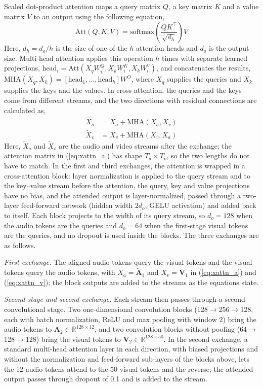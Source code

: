 \documentclass[pdflatex,iicol,sn-basic]{sn-jnl}
\begin{document}
Scaled dot-product attention \citep{vaswani2017attention} maps a query matrix $Q$, a key matrix $K$ and a value matrix $V$ to an output using the following equation,
\begin{equation}
\mathrm{Att}(Q,K,V) = \mathrm{softmax}\!\left(\frac{QK^{\top}}{\sqrt{d_h}}\right) V
\end{equation}
Here, $d_h = d_o / h$ is the size of one of the $h$ attention heads and $d_o$ is the output size. Multi-head attention applies this operation $h$ times with separate learned projections, $\mathrm{head}_i = \mathrm{Att}(X_q W_i^{Q}, X_k W_i^{K}, X_k W_i^{V})$, and concatenates the results, $\mathrm{MHA}(X_q, X_k) = [\mathrm{head}_1, \ldots, \mathrm{head}_h] W^{O}$, where $X_q$ supplies the queries and $X_k$ supplies the keys and the values. In cross-attention, the queries and the keys come from different streams, and the two directions with residual connections are calculated as,
\begin{align}
\tilde{X}_a &= X_a + \mathrm{MHA}(X_a, X_v) \label{eq:xattn_a}\\
\tilde{X}_v &= X_v + \mathrm{MHA}(X_v, X_a) \label{eq:xattn_v}
\end{align}
Here, $\tilde{X}_a$ and $\tilde{X}_v$ are the audio and video streams after the exchange; the attention matrix in (\ref{eq:xattn_a}) has shape $T_a \times T_v$, so the two lengths do not have to match. In the first and third exchanges, the attention is wrapped in a cross-attention block: layer normalization is applied to the query stream and to the key--value stream before the attention, the query, key and value projections have no bias, and the attended output is layer-normalized, passed through a two-layer feed-forward network (hidden width $2d_o$, GELU activation) and added back to itself. Each block projects to the width of its query stream, so $d_o = 128$ when the audio tokens are the queries and $d_o = 64$ when the first-stage visual tokens are the queries, and no dropout is used inside the blocks. The three exchanges are as follows.

\emph{First exchange.} The aligned audio tokens query the visual tokens and the visual tokens query the audio tokens, with $X_a = \tilde{\mathbf{A}}_1$ and $X_v = \mathbf{V}_1$ in (\ref{eq:xattn_a}) and (\ref{eq:xattn_v}); the block outputs are added to the streams as the equations state.

\emph{Second stage and second exchange.} Each stream then passes through a second convolutional stage. Two one-dimensional convolution blocks (128$\to$256$\to$128, each with batch normalization, ReLU and max pooling with window 2) bring the audio tokens to $\mathbf{A}_2 \in \mathbb{R}^{128 \times 12}$, and two convolution blocks without pooling (64$\to$128$\to$128) bring the visual tokens to $\mathbf{V}_2 \in \mathbb{R}^{128 \times 50}$. In the second exchange, a standard multi-head attention layer in each direction, with biased projections and without the normalization and feed-forward sub-layers of the blocks above, lets the 12 audio tokens attend to the 50 visual tokens and the reverse; the attended output passes through dropout of 0.1 and is added to the stream.
\end{document}
